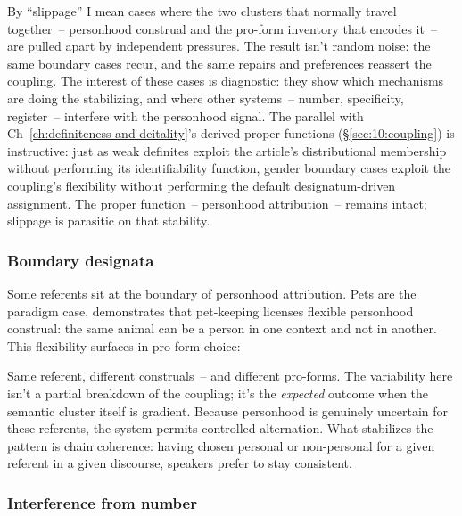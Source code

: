 By \enquote{slippage} I mean cases where the two clusters that normally travel together~-- personhood construal and the pro-form inventory that encodes it~-- are pulled apart by independent pressures. The result isn't random noise: the same boundary cases recur, and the same repairs and preferences reassert the coupling. The interest of these cases is diagnostic: they show which mechanisms are doing the stabilizing, and where other systems~-- number, specificity, register~-- interfere with the personhood signal. The parallel with Ch~\ref{ch:definiteness-and-deitality}'s derived proper functions (§\ref{sec:10:coupling}) is instructive: just as weak definites exploit the article's distributional membership without performing its identifiability function, gender boundary cases exploit the coupling's flexibility without performing the default designatum-driven assignment. The proper function~-- personhood attribution~-- remains intact; slippage is parasitic on that stability.

\subsubsection{Boundary designata}
\label{sec:12:boundary}

Some referents sit at the boundary of personhood attribution. Pets are the paradigm case. \textcite{shirvertesh2012} demonstrates that pet-keeping licenses flexible personhood construal: the same animal can be a person in one context and not in another. This flexibility surfaces in pro-form choice:

\z
{}
\z
Same referent, different construals~-- and different pro-forms. The variability here isn't a partial breakdown of the coupling; it's the \emph{expected} outcome when the semantic cluster itself is gradient. Because personhood is genuinely uncertain for these referents, the system permits controlled alternation. What stabilizes the pattern is chain coherence: having chosen personal or non-personal for a given referent in a given discourse, speakers prefer to stay consistent.

\subsubsection{Interference from number}
\label{sec:12:number}

